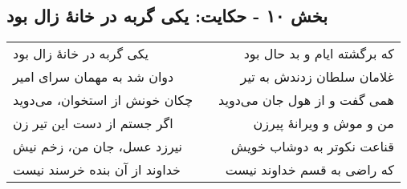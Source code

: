 \begin{center}
\section*{بخش ۱۰ - حکایت: یکی گربه در خانهٔ زال بود}
\label{sec:010}
\begin{longtable}{l p{0.5cm} r}
یکی گربه در خانهٔ زال بود
&&
که برگشته ایام و بد حال بود
\\
دوان شد به مهمان سرای امیر
&&
غلامان سلطان زدندش به تیر
\\
چکان خونش از استخوان، می‌دوید
&&
همی گفت و از هول جان می‌دوید
\\
اگر جستم از دست این تیر زن
&&
من و موش و ویرانهٔ پیرزن
\\
نیرزد عسل، جان من، زخم نیش
&&
قناعت نکوتر به دوشاب خویش
\\
خداوند از آن بنده خرسند نیست
&&
که راضی به قسم خداوند نیست
\\
\end{longtable}
\end{center}

